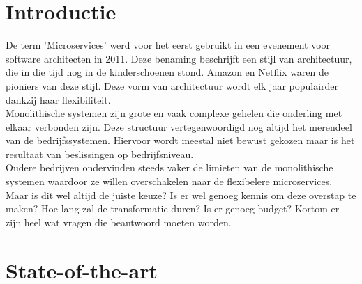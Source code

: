 
\section{Introductie} %
\label{sec:introductie}




De term 'Microservices' werd voor het eerst gebruikt in een evenement voor software architecten in 2011.
Deze benaming beschrijft een stijl van architectuur, die in die tijd nog in de kinderschoenen stond. Amazon en Netflix waren de pioniers van deze stijl. Deze vorm van architectuur wordt elk jaar populairder dankzij haar flexibiliteit.\\
Monolithische systemen zijn grote en vaak complexe gehelen die onderling met elkaar verbonden zijn. Deze structuur vertegenwoordigd nog altijd het merendeel van de bedrijfssystemen. Hiervoor wordt meestal niet bewust gekozen maar is het resultaat van beslissingen op bedrijfsniveau.\\
Oudere bedrijven ondervinden steeds vaker de limieten van de monolithische systemen waardoor ze willen overschakelen naar de flexibelere microservices. Maar is dit wel altijd de juiste keuze? Is er wel genoeg kennis om deze overstap te maken? Hoe lang zal de transformatie duren? Is er genoeg budget? Kortom er zijn heel wat vragen die beantwoord moeten worden.
  

 


\section{State-of-the-art}
\label{sec:state-of-the-art}

